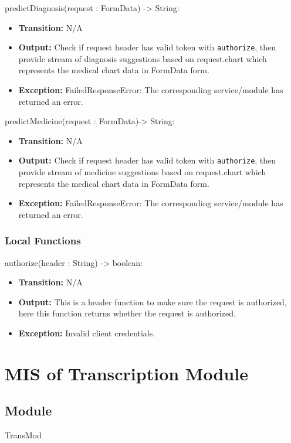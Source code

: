 \documentclass[12pt, titlepage]{article}
\begin{document}
\noindent predictDiagnosis(request : FormData) -> String:
\begin{itemize}
    \item \textbf{Transition:} N/A
    \item \textbf{Output:} Check if request header has valid token with \texttt{authorize}, then provide stream of diagnosis suggestions based on request.chart which represents the medical chart data in FormData form.
    \item \textbf{Exception:} FailedResponseError: The corresponding service/module has returned an error.
\end{itemize}

\noindent predictMedicine(request : FormData)-> String:
\begin{itemize}
    \item \textbf{Transition:} N/A
    \item \textbf{Output:} Check if request header has valid token with \texttt{authorize}, then provide stream of medicine suggestions based on request.chart which represents the medical chart data in FormData form.
    \item \textbf{Exception:} FailedResponseError: The corresponding service/module has returned an error.
\end{itemize}

\subsubsection{Local Functions}

\noindent authorize(header : String) -> boolean:
\begin{itemize}
    \item \textbf{Transition:} N/A
    \item \textbf{Output:} This is a header function to make sure the request is authorized, here this function returns whether the request is authorized.
    \item \textbf{Exception:} Invalid client credentials.
\end{itemize}

\newpage

  
\section{MIS of Transcription Module} \label{trans_mod}

\subsection{Module}
TransMod
\end{document}
